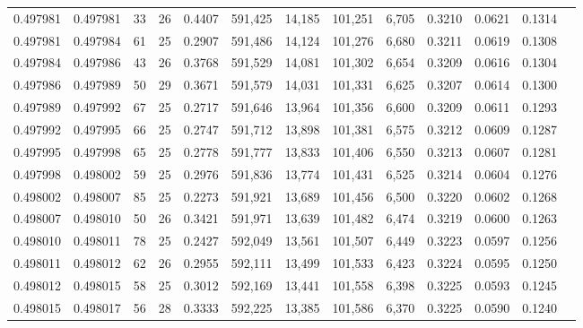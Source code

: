 \begin{tabular}{rrrrrrrrrrrrr}
0.497981 & 0.497981 &  33 &  26 &                                     0.4407 & 591,425 &  14,185 & 101,251 &   6,705 & 0.3210 & 0.0621 & 0.1314 \\
0.497981 & 0.497984 &  61 &  25 &                                     0.2907 & 591,486 &  14,124 & 101,276 &   6,680 & 0.3211 & 0.0619 & 0.1308 \\
0.497984 & 0.497986 &  43 &  26 &                                     0.3768 & 591,529 &  14,081 & 101,302 &   6,654 & 0.3209 & 0.0616 & 0.1304 \\
0.497986 & 0.497989 &  50 &  29 &                                     0.3671 & 591,579 &  14,031 & 101,331 &   6,625 & 0.3207 & 0.0614 & 0.1300 \\
0.497989 & 0.497992 &  67 &  25 &                                     0.2717 & 591,646 &  13,964 & 101,356 &   6,600 & 0.3209 & 0.0611 & 0.1293 \\
0.497992 & 0.497995 &  66 &  25 &                                     0.2747 & 591,712 &  13,898 & 101,381 &   6,575 & 0.3212 & 0.0609 & 0.1287 \\
0.497995 & 0.497998 &  65 &  25 &                                     0.2778 & 591,777 &  13,833 & 101,406 &   6,550 & 0.3213 & 0.0607 & 0.1281 \\
0.497998 & 0.498002 &  59 &  25 &                                     0.2976 & 591,836 &  13,774 & 101,431 &   6,525 & 0.3214 & 0.0604 & 0.1276 \\
0.498002 & 0.498007 &  85 &  25 &                                     0.2273 & 591,921 &  13,689 & 101,456 &   6,500 & 0.3220 & 0.0602 & 0.1268 \\
0.498007 & 0.498010 &  50 &  26 &                                     0.3421 & 591,971 &  13,639 & 101,482 &   6,474 & 0.3219 & 0.0600 & 0.1263 \\
0.498010 & 0.498011 &  78 &  25 &                                     0.2427 & 592,049 &  13,561 & 101,507 &   6,449 & 0.3223 & 0.0597 & 0.1256 \\
0.498011 & 0.498012 &  62 &  26 &                                     0.2955 & 592,111 &  13,499 & 101,533 &   6,423 & 0.3224 & 0.0595 & 0.1250 \\
0.498012 & 0.498015 &  58 &  25 &                                     0.3012 & 592,169 &  13,441 & 101,558 &   6,398 & 0.3225 & 0.0593 & 0.1245 \\
0.498015 & 0.498017 &  56 &  28 &                                     0.3333 & 592,225 &  13,385 & 101,586 &   6,370 & 0.3225 & 0.0590 & 0.1240 \\

\end{tabular}
